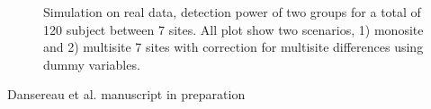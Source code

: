 \documentclass[authoryear]{elsarticle}
\begin{document}
\begin{figure}
\centering
\captionsetup[subfloat]{labelformat=empty}
\hspace{1mm}
\hspace{1mm}
\hspace{1mm}
\tiny Simulation on real data, detection power of two groups for a total of 120 subject between 7 sites. All plot show two scenarios, 1) monosite and 2) multisite 7 sites with correction for multisite differences using dummy variables.
\end{figure}
\tiny Dansereau et al. manuscript in preparation
\end{document}
